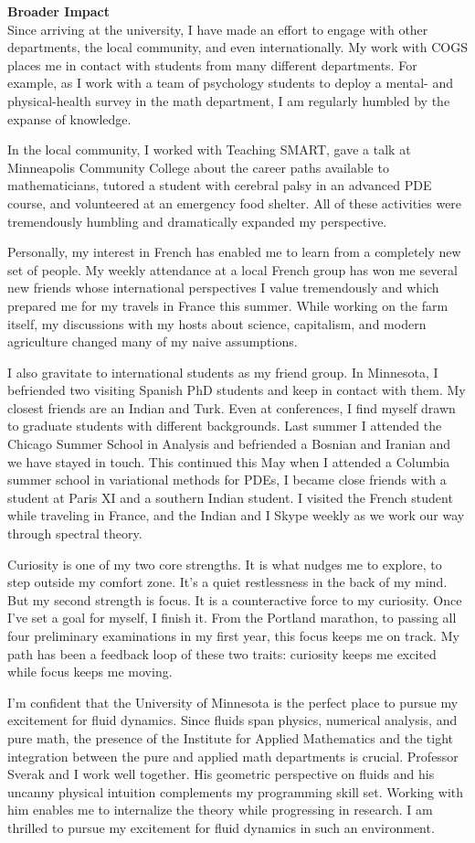 \documentclass[12pt]{article}
\begin{document}
\textbf{Broader Impact}\\
Since arriving at the university, I have made an effort to engage with other departments, the local community, and even internationally. My work with COGS places me in contact with students from many different departments. For example, as I work with a team of psychology students to deploy a mental- and physical-health survey in the math department, I am regularly humbled by the expanse of knowledge.

In the local community, I worked with Teaching SMART, gave a talk at Minneapolis Community College about the career paths available to mathematicians,  tutored a student with cerebral palsy in an advanced PDE course, and volunteered at an emergency food shelter. All of these activities were tremendously humbling and dramatically expanded my perspective.

Personally, my interest in French has enabled me to learn from a completely new set of people. My weekly attendance at a local French group has won me several new friends whose international perspectives I value tremendously and which prepared me for my travels in France this summer. While working on the farm itself, my discussions with my hosts about science, capitalism, and modern agriculture changed many of my naive assumptions. 

I also gravitate to international students as my friend group. In Minnesota, I befriended two visiting Spanish PhD students and keep in contact with them. My closest friends are an Indian and Turk. Even at conferences, I find myself drawn to graduate students with different backgrounds. Last summer I attended the Chicago Summer School in Analysis and befriended a Bosnian and Iranian and we have stayed in touch. This continued this May when I attended a Columbia summer school in variational methods for PDEs, I became close friends with a student at Paris XI and a southern Indian student. I visited the French student while traveling in France, and the Indian and I Skype weekly as we work our way through spectral theory.

Curiosity is one of my two core strengths. It is what nudges me to explore, to step outside my comfort zone. It's a quiet restlessness in the back of my mind. But my second strength is focus. It is a counteractive force to my curiosity. Once I've set a goal for myself, I finish it. From the Portland marathon, to passing all four preliminary examinations in my first year, this focus keeps me on track. My path has been a feedback loop of these two traits: curiosity keeps me excited while focus keeps me moving. 

I'm confident that the University of Minnesota is the perfect place to pursue my excitement for fluid dynamics. Since fluids span physics, numerical analysis, and pure math, the presence of the Institute for Applied Mathematics and the tight integration between the pure and applied math departments is crucial. Professor Sverak and I work well together. His geometric perspective on fluids and his uncanny physical intuition complements my programming skill set. Working with him enables me to internalize the theory while progressing in research. I am thrilled to pursue my excitement for fluid dynamics in such an environment.
\end{document}
